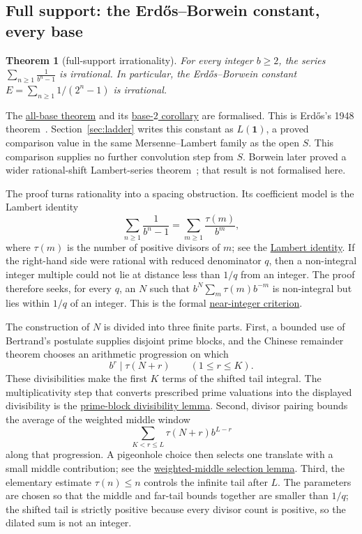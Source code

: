\documentclass[11pt]{article}
\newcommand{\commit}{ebc98ee71f6819bd9fe344a0bb343542c604e533}
\newcommand{\repobase}{https://github.com/wcook04/plectis-lean-erdos249-257/blob/\commit}
\newcommand{\PK}{Erdos249257}
\newcommand{\lword}[4]{\href{\repobase/\PK/#1\#L#2}{#4}}
\newtheorem{theorem}{Theorem}[section]
\theoremstyle{definition}
\theoremstyle{remark}
\begin{document}
\subsection{Full support: the Erd\H{o}s--Borwein constant, every base}

\begin{theorem}[full-support irrationality]\label{res:full}
For every integer $b\ge2$, the series $\displaystyle\sum_{n\ge1}\frac{1}{b^n-1}$ is
irrational. In particular, the Erd\H{o}s--Borwein constant $E=\sum_{n\ge1}1/(2^n-1)$
is irrational.
\end{theorem}
\noindent The
\lword{CertificateKernel.lean}{8000}{irrational_erdosSum_full_support}{all-base theorem}
and its
\lword{CertificateKernel.lean}{8007}{irrational_erdosBorwein_series}{base-\(2\) corollary}
are formalised.  This is Erd\H{o}s's 1948 theorem~\cite[Theorem, p.~63]{erdos1948}.
Section~\ref{sec:ladder} writes this constant as $L(\mathbf 1)$, a proved
comparison value in the same Mersenne--Lambert family as the open $S$.  This
comparison supplies no further convolution step from $S$.  Borwein later proved a wider
rational-shift Lambert-series
theorem~\cite{borwein1992}; that result is not formalised here.

The proof turns rationality into a spacing obstruction.  Its coefficient
model is the Lambert identity
\[
 \sum_{n\geq 1}\frac{1}{b^n-1}
   =\sum_{m\geq 1}\frac{\tau(m)}{b^m},
\]
where $\tau(m)$ is the number of positive divisors of $m$; see the
\lword{CertificateKernel.lean}{5865}{erdosSum_full_support_eq_tsum_divisor_count}{Lambert identity}.
If the right-hand side were rational with reduced denominator $q$, then a
non-integral integer multiple could not lie at distance less than $1/q$ from an
integer.  The proof therefore seeks, for every $q$, an $N$ such that
$b^N\sum_m\tau(m)b^{-m}$ is non-integral but lies within $1/q$ of an integer.
This is the formal
\lword{CertificateKernel.lean}{5792}{irrational_of_int_mul_near_int}{near-integer criterion}.

The construction of $N$ is divided into three finite parts.  First, a bounded
use of Bertrand's postulate supplies disjoint prime blocks, and the Chinese remainder
theorem chooses an arithmetic progression on which
\[
        b^r\mid \tau(N+r) \qquad (1\leq r\leq K).
\]
These divisibilities make the first $K$ terms of the shifted tail integral.
The multiplicativity step that converts prescribed prime valuations into the
displayed divisibility is the
\lword{CertificateKernel.lean}{6177}{bpow_dvd_card_divisors_of_exact_prime_block}{prime-block divisibility lemma}.
Second, divisor pairing bounds the average of the weighted middle window
\[
   \sum_{K<r\leq L}\tau(N+r)b^{L-r}
\]
along that progression.  A pigeonhole choice then selects one translate with a
small middle contribution; see the
\lword{CertificateKernel.lean}{7246}{exists_first_block_progression_with_selected_weighted_middle}{weighted-middle selection lemma}.
Third, the elementary estimate $\tau(n)\leq n$ controls the infinite tail after
$L$.  The parameters are chosen so that the middle and far-tail bounds together
are smaller than $1/q$; the shifted tail is strictly positive because every
divisor count is positive, so the dilated sum is not an integer.
\end{document}
